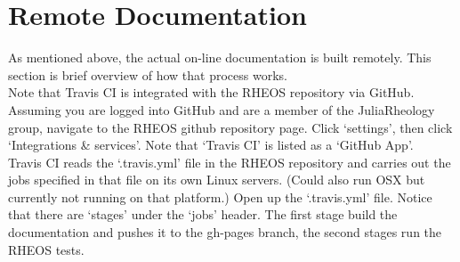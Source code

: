 \documentclass[]{article}
\begin{document}
\section{Remote Documentation}

As mentioned above, the actual on-line documentation is built remotely. This section is brief overview of how that process works.\\

Note that Travis CI is integrated with the RHEOS repository via GitHub. Assuming you are logged into GitHub and are a member of the JuliaRheology group, navigate to the RHEOS github repository page. Click `settings', then click `Integrations \& services'. Note that `Travis CI' is listed as a `GitHub App'.\\

Travis CI reads the `.travis.yml' file in the RHEOS repository and carries out the jobs specified in that file on its own Linux servers. (Could also run OSX but currently not running on that platform.) Open up the `.travis.yml' file. Notice that there are `stages' under the `jobs' header. The first stage build the documentation and pushes it to the gh-pages branch, the second stages run the RHEOS tests.
\end{document}
